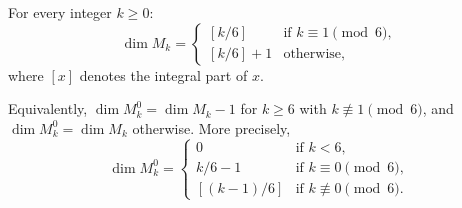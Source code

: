 For every integer $k \geq 0$:
$$\dim M_k = \begin{cases}
[k/6] & \text{if } k \equiv 1 \pmod{6}, \\
[k/6] + 1 & \text{otherwise},
\end{cases}$$
where $[x]$ denotes the integral part of $x$.

Equivalently, $\dim M_k^0 = \dim M_k - 1$ for $k \geq 6$ with $k \not\equiv 1 \pmod{6}$, and $\dim M_k^0 = \dim M_k$ otherwise. More precisely,
$$\dim M_k^0 = \begin{cases}
0 & \text{if } k < 6, \\
k/6 - 1 & \text{if } k \equiv 0 \pmod{6},\\
[(k-1)/6] & \text{if } k \not\equiv 0 \pmod{6}.
\end{cases}$$
